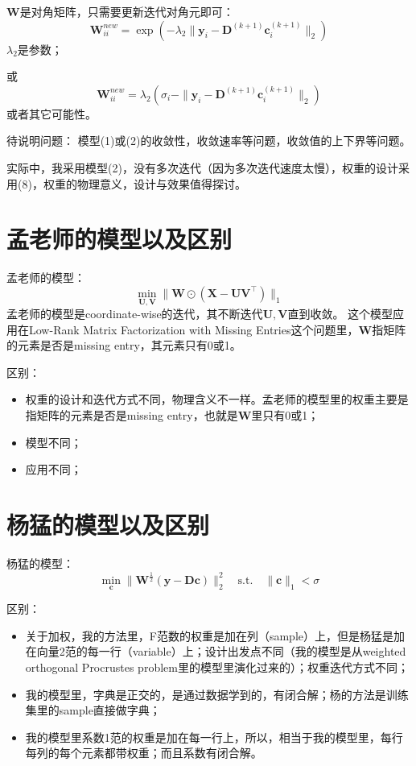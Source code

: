 \documentclass[10pt,twocolumn,letterpaper]{article}
\begin{document}
$\mathbf{W}$是对角矩阵，只需要更新迭代对角元即可：
\begin{equation}
\mathbf{W}_{ii}^{new}=\exp(-\lambda_{2}\|\mathbf{y}_{i}-\mathbf{D}^{(k+1)}\mathbf{c}_{i}^{(k+1)}\|_{2})
\end{equation}
$\lambda_{2}$是参数；

或
\begin{equation}
\mathbf{W}_{ii}^{new}=\lambda_{2}(\sigma_{i}-\|\mathbf{y}_{i}-\mathbf{D}^{(k+1)}\mathbf{c}_{i}^{(k+1)}\|_{2})
\end{equation}
或者其它可能性。

待说明问题：
模型(1)或(2)的收敛性，收敛速率等问题，收敛值的上下界等问题。

实际中，我采用模型(2)，没有多次迭代（因为多次迭代速度太慢），权重的设计采用(8)，权重的物理意义，设计与效果值得探讨。

\section{孟老师的模型以及区别}
孟老师的模型：
\begin{equation}
\min_{\mathbf{U},\mathbf{V}}\|\mathbf{W}\odot(\mathbf{X}-\mathbf{U}\mathbf{V}^{\top})\|_{1}
\end{equation}
孟老师的模型是coordinate-wise的迭代，其不断迭代$\mathbf{U},\mathbf{V}$直到收敛。
这个模型应用在Low-Rank Matrix Factorization with Missing Entries这个问题里，$\mathbf{W}$指矩阵的元素是否是missing entry，其元素只有0或1。

区别：
\begin{itemize}
\item 权重的设计和迭代方式不同，物理含义不一样。孟老师的模型里的权重主要是指矩阵的元素是否是missing entry，也就是$\mathbf{W}$里只有0或1；
\item 模型不同；
\item 应用不同；
\end{itemize}

\section{杨猛的模型以及区别}
杨猛的模型：
\begin{equation}
\min_{\mathbf{c}}\|\mathbf{W}^{\frac{1}{2}}(\mathbf{y}-\mathbf{D}\mathbf{c})\|_{2}^{2}
\quad
\text{s.t.}
\quad
\|\mathbf{c}\|_{1}<\sigma
\end{equation}

区别：
\begin{itemize}
\item 关于加权，我的方法里，F范数的权重是加在列（sample）上，但是杨猛是加在向量2范的每一行（variable）上；设计出发点不同（我的模型是从weighted orthogonal Procrustes problem里的模型里演化过来的）；权重迭代方式不同；
\item 我的模型里，字典是正交的，是通过数据学到的，有闭合解；杨的方法是训练集里的sample直接做字典；
\item 我的模型里系数1范的权重是加在每一行上，所以，相当于我的模型里，每行每列的每个元素都带权重；而且系数有闭合解。
\end{itemize}



{\small


}
\end{document}
